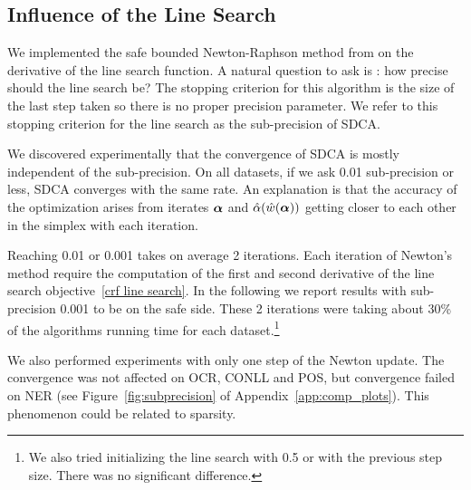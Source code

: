 \subsection{Influence of the Line Search}\label{experiment line search}

We implemented the safe bounded Newton-Raphson method from \citet[Section 9.4]{press_numerical_1992} on the derivative of the line search function.
A natural question to ask is : how precise should the line search be?
The stopping criterion for this algorithm is the size of the last step taken so there is no proper precision parameter.
We refer to this stopping criterion for the line search as the sub-precision of SDCA.

We discovered experimentally that the convergence of SDCA is mostly  independent of the sub-precision.
On all datasets, if we ask 0.01 sub-precision or less, SDCA converges with the same rate.
An explanation is that the accuracy of the optimization arises from iterates $\boldsymbol{\alpha}$ and $\hat \alpha(\hat w(\boldsymbol{\alpha}))$ getting closer to each other in the simplex with each iteration.

Reaching 0.01 or 0.001 takes on average 2 iterations.
Each iteration of Newton's method require the computation of the first and second derivative of the line search objective~\eqref{crf line search}.
In the following we report results with sub-precision 0.001 to be on the safe side.
These 2 iterations were taking about 30\% of the algorithms running time for each dataset.\footnote{
We also tried initializing the line search with 0.5 or with the previous step size.
There was no significant difference.
}

We also performed experiments with only one step of the Newton update.
The convergence was not affected on OCR, CONLL and POS, but convergence failed on NER (see Figure~\ref{fig:subprecision} of Appendix~\ref{app:comp_plots}).
This phenomenon could be related to sparsity.

